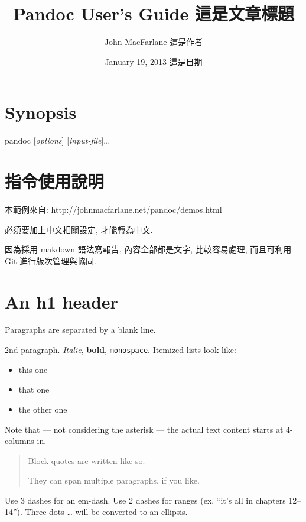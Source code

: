 \documentclass[]{article}
\title{Pandoc User's Guide 這是文章標題}
\author{John MacFarlane 這是作者}
\date{January 19, 2013 這是日期}
\begin{document}
\maketitle

{
\hypersetup{linkcolor=black}
\setcounter{tocdepth}{3}
\tableofcontents
}
\section{Synopsis}\label{synopsis}

pandoc {[}\emph{options}{]} {[}\emph{input-file}{]}\ldots{}

\section{指令使用說明}\label{ux6307ux4ee4ux4f7fux7528ux8aaaux660e}

本範例來自: http://johnmacfarlane.net/pandoc/demos.html

必須要加上中文相關設定, 才能轉為中文.

因為採用 makdown 語法寫報告, 內容全部都是文字, 比較容易處理, 而且可利用
Git 進行版次管理與協同.

\section{An h1 header}\label{an-h1-header}

Paragraphs are separated by a blank line.

2nd paragraph. \emph{Italic}, \textbf{bold}, \texttt{monospace}.
Itemized lists look like:

\begin{itemize}
\itemsep1pt\parskip0pt
\item
  this one
\item
  that one
\item
  the other one
\end{itemize}

Note that --- not considering the asterisk --- the actual text content
starts at 4-columns in.

\begin{quote}
Block quotes are written like so.

They can span multiple paragraphs, if you like.
\end{quote}

Use 3 dashes for an em-dash. Use 2 dashes for ranges (ex. ``it's all in
chapters 12--14''). Three dots \ldots{} will be converted to an
ellipsis.
\end{document}

